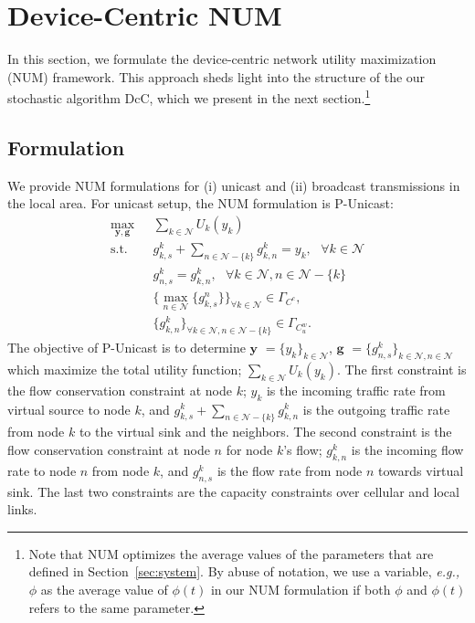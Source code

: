 \documentclass[conference]{IEEEtran}
\newcommand{\eg}{{\em e.g., }}
\newcommand{\Nset}{\mathcal{N}}
\begin{document}
\section{\label{sec:NUM} Device-Centric NUM}
In this section, we formulate the device-centric network utility maximization (NUM) framework. This approach sheds light into the structure of the our stochastic algorithm DcC, which we present in the next section.\footnote{Note that NUM optimizes the average values of the parameters that are defined in Section~\ref{sec:system}. By abuse of notation, we use a variable, \eg $\phi$ as the average value of $\phi(t)$  in our NUM formulation if both $\phi$ and $\phi(t)$ refers to the same parameter.}

\subsection{\label{sec:NUM_Formulation} Formulation}
We provide NUM formulations for (i) unicast and (ii) broadcast transmissions in the local area. For unicast setup, the NUM formulation is P-Unicast:
\begin{align} \label{opt:eq1}
\max_{\boldsymbol y, \boldsymbol g} \mbox{ } & \sum_{k \in \Nset} U_{k}(y_k)  \nonumber \\
\mbox{s.t.} \mbox{ }  & g_{k,s}^{k} + \sum_{n \in \Nset-\{k\}} g_{k,n}^{k} = y_{k}, \mbox{ } \forall k \in \Nset \nonumber \\
& g_{n,s}^{k} = g_{k,n}^{k}, \mbox{ } \forall k \in \Nset, n \in \Nset-\{k\} \nonumber \\
& \{\max_{n \in \Nset} \{g_{k,s}^{n}\}\}_{\forall k \in \Nset} \in \Gamma_{C^c},  \nonumber \\
& \{g_{k,n}^{k}\}_{\forall k \in \Nset, n \in \Nset -\{k\}} \in \Gamma_{C_{u}^{w}}.
\end{align}
The objective of P-Unicast is to determine $\boldsymbol y$ $= \{y_k\}_{k \in \Nset}$, $\boldsymbol g$ $= \{g_{n,s}^{k}\}_{k \in \Nset, n \in \Nset}$ which maximize the total utility function; $\sum_{k \in \Nset} U_{k}(y_k)$.
The first constraint is the flow conservation constraint at node $k$; $y_k$ is the incoming traffic rate from virtual source to node $k$, and $g_{k,s}^{k} + \sum_{n \in \Nset-\{k\}} g_{k,n}^{k}$ is the outgoing traffic rate from node $k$ to the virtual sink and the neighbors. The second constraint is the flow conservation constraint at node $n$ for node $k$'s flow; $g_{k,n}^{k}$ is the incoming flow rate to node $n$ from node $k$, and $g_{n,s}^{k}$ is the flow rate from node $n$ towards virtual sink. The last two constraints are the capacity constraints over cellular and local links.
\end{document}
